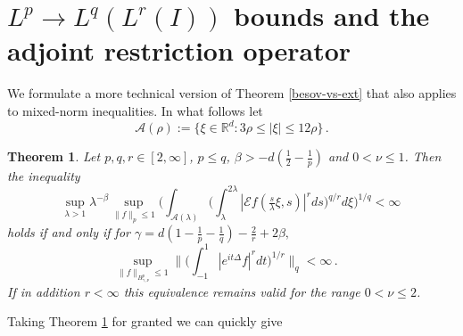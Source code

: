 \documentclass[11pt]{amsart}
\newtheorem{theorem}{Theorem}[section]
\theoremstyle{definition}
\numberwithin{theorem}{section}
\numberwithin{definition}{section}
\numberwithin{equation}{section}
\def\inn#1#2{\langle#1,#2\rangle}
\newcommand{\Be}{\begin{equation}}
\newcommand{\Ee}{\end{equation}}
\renewcommand{\le}{\leqslant}
\def\inn#1#2{\langle#1,#2\rangle}
\def\lc{\lesssim}
\def\la{\lambda}             \def\La{\Lambda}
\def\bbR{{\mathbb {R}}}
\def\cA{{\mathcal {A}}}
\def\cE{{\mathcal {E}}}
\renewcommand{\le}{\leqslant}
\begin{document}
\section{$L^p\to L^q(L^r(I))$
bounds and the adjoint restriction operator}
\label{adjressect}





We formulate a more technical version of Theorem \ref{besov-vs-ext}
that also applies to mixed-norm inequalities. In what follows let
\Be\label{annulus} \cA(\rho):=\{\xi\in \bbR^{d}: 3\rho\le|\xi|\le
12\rho\}\,. \Ee

\begin{theorem}\label{besovextequiv}
Let $p,q,r\in [2,\infty]$, $p\le q$,  $\beta> -d(\frac{1}{2}-\frac{1}{p})$
and $0<\nu\le 1$. Then
the inequality
\Be
\label{lqlrforext}%
\sup_{\la> 1} \la^{-\beta} \sup_{\|f\|_p\le 1}
 \Big(\int_{\cA(\la)} \Big(\int_{\la}^{2\la}
  |\cE f(\tfrac{ s }{\la}\xi,  s )|^r d s  \Big)^{q/r} d\xi\Big)^{1/q}
<\infty\,
\Ee
holds if and only if for $\gamma = d(1-\frac 1p-\frac 1q)-\frac 2r+2\beta,
$
\Be\label{lqlrbesSchr}%
\sup_{\|f\|_{B^p_{\gamma,\nu}} \le 1}
\Big\| \Big(\int_{-1}^1 |e^{it\Delta} f|^r dt\Big)^{1/r}\Big\|_q <\infty\,.
\quad
\Ee
If in addition $r<\infty$ this  equivalence remains valid for the range
$0<\nu\le 2$.



\end{theorem}

Taking Theorem \ref{besovextequiv} for granted we can quickly give
\end{document}
